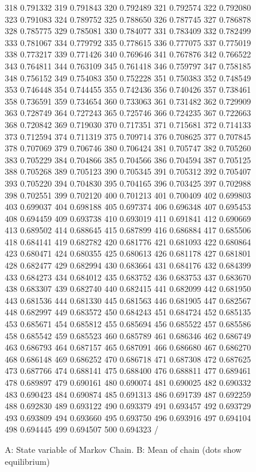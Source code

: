 \begin{figure}
{    318 0.791332
    319 0.791843
    320 0.792489
    321 0.792574
    322 0.792080
    323 0.791083
    324 0.789752
    325 0.788650
    326 0.787745
    327 0.786878
    328 0.785775
    329 0.785081
    330 0.784077
    331 0.783409
    332 0.782499
    333 0.781067
    334 0.779792
    335 0.778615
    336 0.777075
    337 0.775019
    338 0.773217
    339 0.771426
    340 0.769646
    341 0.767876
    342 0.766522
    343 0.764811
    344 0.763109
    345 0.761418
    346 0.759797
    347 0.758185
    348 0.756152
    349 0.754083
    350 0.752228
    351 0.750383
    352 0.748549
    353 0.746448
    354 0.744455
    355 0.742436
    356 0.740426
    357 0.738461
    358 0.736591
    359 0.734654
    360 0.733063
    361 0.731482
    362 0.729909
    363 0.728749
    364 0.727243
    365 0.725746
    366 0.724235
    367 0.722663
    368 0.720842
    369 0.719030
    370 0.717351
    371 0.715681
    372 0.714133
    373 0.712594
    374 0.711319
    375 0.709714
    376 0.708625
    377 0.707845
    378 0.707069
    379 0.706746
    380 0.706424
    381 0.705747
    382 0.705260
    383 0.705229
    384 0.704866
    385 0.704566
    386 0.704594
    387 0.705125
    388 0.705268
    389 0.705123
    390 0.705345
    391 0.705312
    392 0.705407
    393 0.705220
    394 0.704830
    395 0.704165
    396 0.703425
    397 0.702988
    398 0.702551
    399 0.702120
    400 0.701213
    401 0.700409
    402 0.699803
    403 0.699037
    404 0.698188
    405 0.697374
    406 0.696348
    407 0.695453
    408 0.694459
    409 0.693738
    410 0.693019
    411 0.691841
    412 0.690669
    413 0.689502
    414 0.688645
    415 0.687899
    416 0.686884
    417 0.685506
    418 0.684141
    419 0.682782
    420 0.681776
    421 0.681093
    422 0.680864
    423 0.680471
    424 0.680355
    425 0.680613
    426 0.681178
    427 0.681801
    428 0.682477
    429 0.682994
    430 0.683664
    431 0.684176
    432 0.684399
    433 0.684273
    434 0.684012
    435 0.683752
    436 0.683753
    437 0.683670
    438 0.683307
    439 0.682740
    440 0.682415
    441 0.682099
    442 0.681950
    443 0.681536
    444 0.681330
    445 0.681563
    446 0.681905
    447 0.682567
    448 0.682997
    449 0.683572
    450 0.684243
    451 0.684724
    452 0.685135
    453 0.685671
    454 0.685812
    455 0.685694
    456 0.685522
    457 0.685586
    458 0.685542
    459 0.685523
    460 0.685789
    461 0.686346
    462 0.686749
    463 0.686793
    464 0.687157
    465 0.687091
    466 0.686680
    467 0.686270
    468 0.686148
    469 0.686252
    470 0.686718
    471 0.687308
    472 0.687625
    473 0.687766
    474 0.688141
    475 0.688400
    476 0.688811
    477 0.689461
    478 0.689897
    479 0.690161
    480 0.690074
    481 0.690025
    482 0.690332
    483 0.690423
    484 0.690874
    485 0.691313
    486 0.691739
    487 0.692259
    488 0.692830
    489 0.693122
    490 0.693379
    491 0.693457
    492 0.693729
    493 0.693809
    494 0.693660
    495 0.693750
    496 0.693916
    497 0.694104
    498 0.694445
    499 0.694507
    500 0.694323
/
\endpicture}
\caption{A: State variable of Markov Chain.  B: Mean of chain (dots
  show equilibrium)} 
\end{figure}

